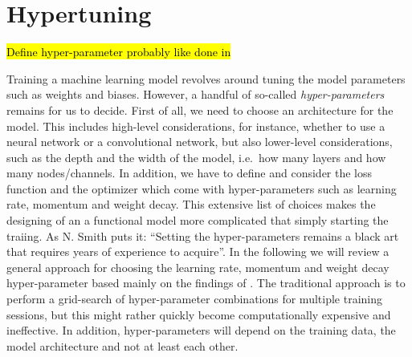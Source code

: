 \section{Hypertuning}
\hl{Define hyper-parameter probably like done in} \cite{Bengio2012}

Training a machine learning model revolves around tuning the model parameters such as weights and biases. However, a handful of so-called \textit{hyper-parameters} remains for us to decide. First of all, we need to choose an architecture for the model. This includes high-level considerations, for instance, whether to use a neural network or a convolutional network, but also lower-level considerations, such as the depth and the width of the model, i.e.\ how many layers and how many nodes/channels. In addition, we have to define and consider the loss function and the optimizer which come with hyper-parameters such as learning rate, momentum and weight decay. This extensive list of choices makes the designing of an a functional model more complicated that simply starting the traiing. As N. Smith \cite{smith2018disciplined} puts it: ``Setting the
hyper-parameters remains a black art that requires years of experience to
acquire''. In the following we will review a general approach for choosing the learning rate, momentum and weight decay hyper-parameter based mainly on the findings of \cite{smith2018disciplined}. The traditional approach is to
perform a grid-search of hyper-parameter combinations for multiple training sessions, but this might rather quickly become computationally expensive and ineffective. In addition, hyper-parameters will depend on the training data, the model architecture and not at least each other. 



